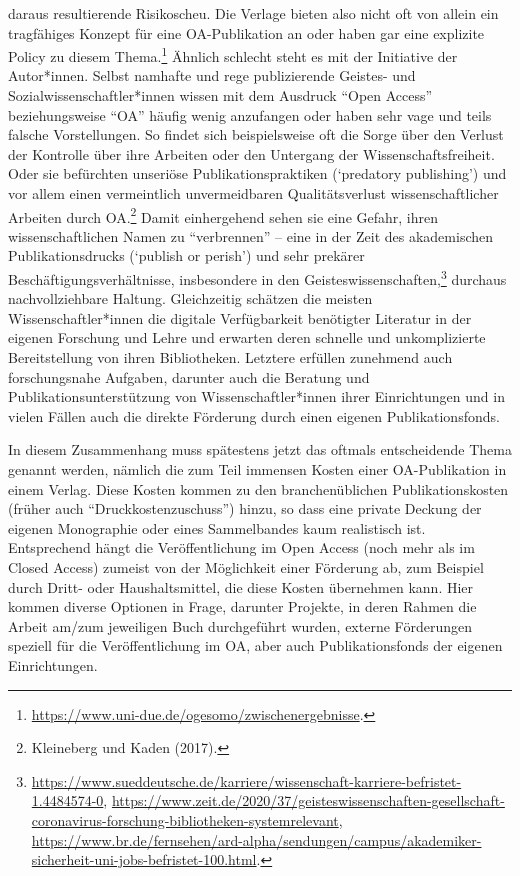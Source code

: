 \documentclass[a4paper,
fontsize=11pt,
oneside,
numbers=noperiodatend,
parskip=half-,
bibliography=totoc,
final
]{scrartcl}
\begin{document}
daraus resultierende Risikoscheu. Die Verlage bieten also nicht oft von
allein ein tragfähiges Konzept für eine OA-Publikation an oder haben gar
eine explizite Policy zu diesem Thema.\footnote{\url{https://www.uni-due.de/ogesomo/zwischenergebnisse}.}
Ähnlich schlecht steht es mit der Initiative der Autor*innen. Selbst
namhafte und rege publizierende Geistes- und Sozialwissenschaftler*innen
wissen mit dem Ausdruck ``Open Access'' beziehungsweise ``OA'' häufig
wenig anzufangen oder haben sehr vage und teils falsche Vorstellungen.
So findet sich beispielsweise oft die Sorge über den Verlust der
Kontrolle über ihre Arbeiten oder den Untergang der
Wissenschaftsfreiheit. Oder sie befürchten unseriöse
Publikationspraktiken (`predatory publishing') und vor allem einen
vermeintlich unvermeidbaren Qualitätsverlust wissenschaftlicher Arbeiten
durch OA.\footnote{Kleineberg und Kaden (2017).} Damit einhergehend
sehen sie eine Gefahr, ihren wissenschaftlichen Namen zu ``verbrennen''
-- eine in der Zeit des akademischen Publikationsdrucks (`publish or
perish') und sehr prekärer Beschäftigungsverhältnisse, insbesondere in
den Geisteswissenschaften,\footnote{\url{https://www.sueddeutsche.de/karriere/wissenschaft-karriere-befristet-1.4484574-0},
  \url{https://www.zeit.de/2020/37/geisteswissenschaften-gesellschaft-coronavirus-forschung-bibliotheken-systemrelevant},
  \url{https://www.br.de/fernsehen/ard-alpha/sendungen/campus/akademiker-sicherheit-uni-jobs-befristet-100.html}.}
durchaus nachvollziehbare Haltung. Gleichzeitig schätzen die meisten
Wissenschaftler*innen die digitale Verfügbarkeit benötigter Literatur in
der eigenen Forschung und Lehre und erwarten deren schnelle und
unkomplizierte Bereitstellung von ihren Bibliotheken. Letztere erfüllen
zunehmend auch forschungsnahe Aufgaben, darunter auch die Beratung und
Publikationsunterstützung von Wissenschaftler*innen ihrer Einrichtungen
und in vielen Fällen auch die direkte Förderung durch einen eigenen
Publikationsfonds.

In diesem Zusammenhang muss spätestens jetzt das oftmals entscheidende
Thema genannt werden, nämlich die zum Teil immensen Kosten einer
OA-Publikation in einem Verlag. Diese Kosten kommen zu den
branchenüblichen Publikationskosten (früher auch
``Druckkostenzuschuss'') hinzu, so dass eine private Deckung der eigenen
Monographie oder eines Sammelbandes kaum realistisch ist. Entsprechend
hängt die Veröffentlichung im Open Access (noch mehr als im Closed
Access) zumeist von der Möglichkeit einer Förderung ab, zum Beispiel
durch Dritt- oder Haushaltsmittel, die diese Kosten übernehmen kann.
Hier kommen diverse Optionen in Frage, darunter Projekte, in deren
Rahmen die Arbeit am/zum jeweiligen Buch durchgeführt wurden, externe
Förderungen speziell für die Veröffentlichung im OA, aber auch
Publikationsfonds der eigenen Einrichtungen.
\end{document}
